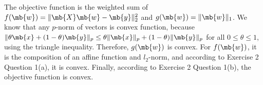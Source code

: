 \begin{exercise}
\begin{enumerate}
      \begin{solution}
        The objective function is the weighted sum of $f(\mb{w}) = \|\mb{X}\mb{w}-\mb{y}\|_2^2$ and $g(\mb{w}) = \|\mb{w}\|_1$. We know that any $p$-norm of vectors is convex function, because $\|\theta\mb{x} + (1-\theta)\mb{y}\|_p \le \theta\|\mb{x}\|_p + (1-\theta)\|\mb{y}\|_p$ for all $0 \le \theta \le 1$, using the triangle inequality. Therefore, $g(\mb{w})$ is convex. For $f(\mb{w})$, it is the composition of an affine function and $l_2$-norm, and according to Exercise 2 Question 1(a), it is convex. Finally, according to Exercise 2 Question 1(b), the objective function is convex.
        \qedhere
      \end{solution}
      
  \end{enumerate}
\end{exercise}
\newpage



